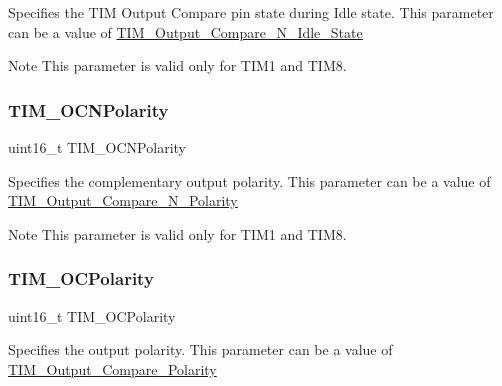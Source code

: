 Specifies the T\+IM Output Compare pin state during Idle state. This parameter can be a value of \mbox{\hyperlink{group___t_i_m___output___compare___n___idle___state}{T\+I\+M\+\_\+\+Output\+\_\+\+Compare\+\_\+\+N\+\_\+\+Idle\+\_\+\+State}} \begin{DoxyNote}{Note}
This parameter is valid only for T\+I\+M1 and T\+I\+M8. 
\end{DoxyNote}
\mbox{\label{struct_t_i_m___o_c_init_type_def_aa392739b843a7974702c5ec71864f982}} 
\subsubsection{\texorpdfstring{TIM\_OCNPolarity}{TIM\_OCNPolarity}}
{\footnotesize\ttfamily uint16\+\_\+t T\+I\+M\+\_\+\+O\+C\+N\+Polarity}

Specifies the complementary output polarity. This parameter can be a value of \mbox{\hyperlink{group___t_i_m___output___compare___n___polarity}{T\+I\+M\+\_\+\+Output\+\_\+\+Compare\+\_\+\+N\+\_\+\+Polarity}} \begin{DoxyNote}{Note}
This parameter is valid only for T\+I\+M1 and T\+I\+M8. 
\end{DoxyNote}
\mbox{\label{struct_t_i_m___o_c_init_type_def_acc7066b59671f62f2696c382c879c9c8}} 
\subsubsection{\texorpdfstring{TIM\_OCPolarity}{TIM\_OCPolarity}}
{\footnotesize\ttfamily uint16\+\_\+t T\+I\+M\+\_\+\+O\+C\+Polarity}

Specifies the output polarity. This parameter can be a value of \mbox{\hyperlink{group___t_i_m___output___compare___polarity}{T\+I\+M\+\_\+\+Output\+\_\+\+Compare\+\_\+\+Polarity}} \mbox{\label{struct_t_i_m___o_c_init_type_def_a74a30f1a994c6676c0ce2b56243ed184}} 
